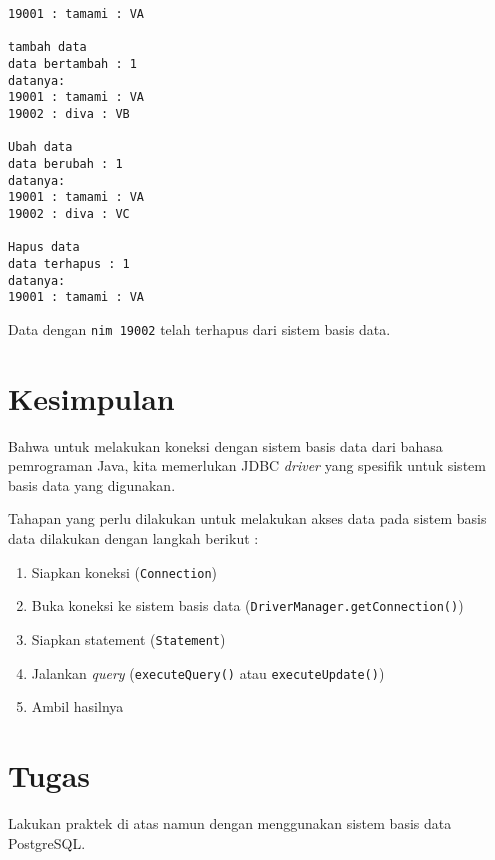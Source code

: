 \begin{lstlisting}
19001 : tamami : VA

tambah data
data bertambah : 1
datanya:
19001 : tamami : VA
19002 : diva : VB

Ubah data
data berubah : 1
datanya:
19001 : tamami : VA
19002 : diva : VC

Hapus data
data terhapus : 1
datanya:
19001 : tamami : VA
\end{lstlisting}

Data dengan \texttt{nim 19002} telah terhapus dari sistem basis data.

\section{Kesimpulan}

Bahwa untuk melakukan koneksi dengan sistem basis data dari bahasa pemrograman Java, kita memerlukan JDBC \textit{driver} yang spesifik untuk sistem basis data yang digunakan. 

Tahapan yang perlu dilakukan untuk melakukan akses data pada sistem basis data dilakukan dengan langkah berikut :

\begin{enumerate}
\item Siapkan koneksi (\texttt{Connection})
\item Buka koneksi ke sistem basis data (\texttt{DriverManager.getConnection()})
\item Siapkan statement (\texttt{Statement})
\item Jalankan \textit{query} (\texttt{executeQuery()} atau \texttt{executeUpdate()})
\item Ambil hasilnya
\end{enumerate}

\section{Tugas}

Lakukan praktek di atas namun dengan menggunakan sistem basis data PostgreSQL.